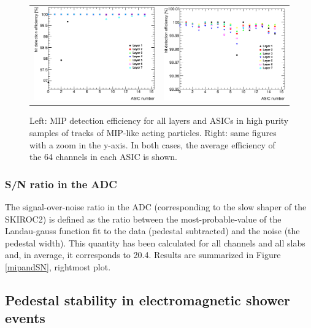 \documentclass[a4paper,11pt]{article}
\begin{document}
\begin{figure}[!t]
  \centering 
    \begin{tabular}{ll}
      \includegraphics[width=2.8in]{figs/MIP/efficiency_nhits4_chips.eps} & \includegraphics[width=2.8in]{figs/MIP/efficiency_nhits4_chips_zoom.eps} \\
    \end{tabular}
    \caption{Left: MIP detection efficiency for all layers and ASICs in high purity samples of tracks of MIP-like acting particles. Right: same figures with a zoom in the y-axis. In both cases, the average efficiency of the 64 channels in each ASIC is shown.}
\label{efficiency}
\end{figure}


\subsubsection{S/N ratio in the ADC}
\label{sec:sn}

The signal-over-noise ratio in the ADC (corresponding to the slow shaper of the SKIROC2) is defined 
as the ratio between the most-probable-value of
the Landau-gauss function fit to the data (pedestal subtracted) and the noise (the pedestal width). This quantity 
has been calculated for all channels and all slabs and, in average, it corresponds to 20.4.
Results are summarized in Figure \ref{mipandSN}, rightmost plot.


\subsection{Pedestal stability in electromagnetic shower events}
\label{sec:showers}
\end{document}
